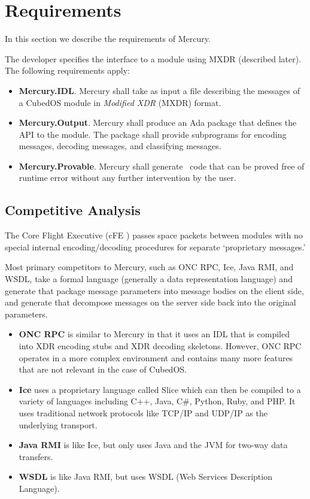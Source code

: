 \section{Requirements}
\label{sec:mercury-requirements}

In this section we describe the requirements of Mercury.

The developer specifies the interface to a module using MXDR (described later). The following
requirements apply:

\begin{itemize}
\item \textbf{Mercury.IDL}. Mercury shall take as input a file describing the messages of a
CubedOS module in \textit{Modified XDR} (MXDR) format.

\item \textbf{Mercury.Output}. Mercury shall produce an Ada package that defines the API to the
module. The package shall provide subprograms for encoding messages, decoding messages, and
classifying messages.

\item \textbf{Mercury.Provable}. Mercury shall generate \SPARK\ code that can be proved free of
runtime error without any further intervention by the user.
\end{itemize}

\subsection{Competitive Analysis}

The Core Flight Executive (cFE \cite{cFE}) passes space packets between modules with no special
internal encoding/decoding procedures for separate `proprietary messages.'

Most primary competitors to Mercury, such as ONC RPC, Ice, Java RMI, and WSDL, take a formal
language (generally a data representation language) and generate  that package
message parameters into message bodies on the client side,  and generate 
that decompose messages on the server side back into the original parameters.

\begin{itemize}
\item \textbf{ONC RPC} is similar to Mercury in that it uses an IDL that is compiled into XDR
encoding stubs and XDR decoding skeletons. However, ONC RPC operates in a more complex
environment and contains many more features that are not relevant in the case of CubedOS.

\item \textbf{Ice} uses a proprietary language called Slice which can then be compiled to a
variety of languages including C++, Java, C\#, Python, Ruby, and PHP. It uses traditional
network protocols like TCP/IP and UDP/IP as the underlying transport.

\item \textbf{Java RMI} is like Ice, but only uses Java and the JVM for two-way data transfers.

\item \textbf{WSDL} is like Java RMI, but uses WSDL (Web Services Description Language).
\end{itemize}

